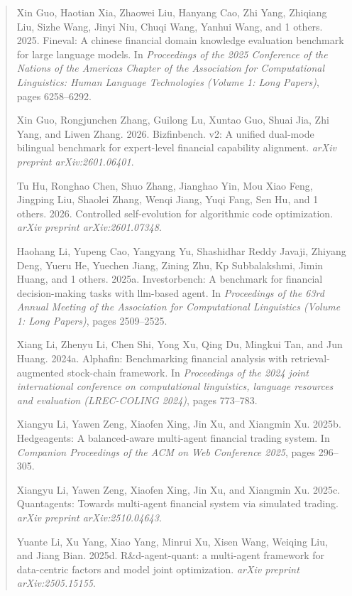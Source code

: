 \documentclass[
]{article}
\begin{document}
\begin{quote}
Xin Guo, Haotian Xia, Zhaowei Liu, Hanyang Cao, Zhi Yang, Zhiqiang Liu,
Sizhe Wang, Jinyi Niu, Chuqi Wang, Yanhui Wang, and 1 others. 2025.
Fineval: A chinese financial domain knowledge evaluation benchmark for
large language models. In \emph{Proceedings of the 2025 Conference of
the Nations of the Americas Chapter of the Association for Computational
Linguistics: Human Language Technologies (Volume 1: Long Papers)}, pages
6258--6292.

Xin Guo, Rongjunchen Zhang, Guilong Lu, Xuntao Guo, Shuai Jia, Zhi Yang,
and Liwen Zhang. 2026. Bizfinbench. v2: A unified dual-mode bilingual
benchmark for expert-level financial capability alignment. \emph{arXiv
preprint arXiv:2601.06401}.

Tu Hu, Ronghao Chen, Shuo Zhang, Jianghao Yin, Mou Xiao Feng, Jingping
Liu, Shaolei Zhang, Wenqi Jiang, Yuqi Fang, Sen Hu, and 1 others. 2026.
Controlled self-evolution for algorithmic code optimization. \emph{arXiv
preprint arXiv:2601.07348}.

Haohang Li, Yupeng Cao, Yangyang Yu, Shashidhar Reddy Javaji, Zhiyang
Deng, Yueru He, Yuechen Jiang, Zining Zhu, Kp Subbalakshmi, Jimin Huang,
and 1 others. 2025a. Investorbench: A benchmark for financial
decision-making tasks with llm-based agent. In \emph{Proceedings of the
63rd Annual Meeting of the Association for Computational Linguistics
(Volume 1: Long Papers)}, pages 2509--2525.

Xiang Li, Zhenyu Li, Chen Shi, Yong Xu, Qing Du, Mingkui Tan, and Jun
Huang. 2024a. Alphafin: Benchmarking financial analysis with
retrieval-augmented stock-chain framework. In \emph{Proceedings of the
2024 joint international conference on computational linguistics,
language resources and evaluation (LREC-COLING 2024)}, pages 773--783.

Xiangyu Li, Yawen Zeng, Xiaofen Xing, Jin Xu, and Xiangmin Xu. 2025b.
Hedgeagents: A balanced-aware multi-agent financial trading system. In
\emph{Companion Proceedings of the ACM on Web Conference 2025}, pages
296--305.

Xiangyu Li, Yawen Zeng, Xiaofen Xing, Jin Xu, and Xiangmin Xu. 2025c.
Quantagents: Towards multi-agent financial system via simulated trading.
\emph{arXiv preprint arXiv:2510.04643}.

Yuante Li, Xu Yang, Xiao Yang, Minrui Xu, Xisen Wang, Weiqing Liu, and
Jiang Bian. 2025d. R\&d-agent-quant: a multi-agent framework for
data-centric factors and model joint optimization. \emph{arXiv preprint
arXiv:2505.15155}.


\end{quote}
\end{document}
